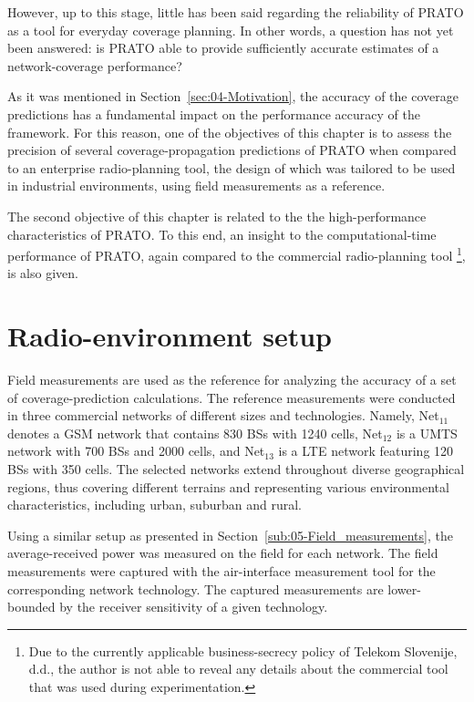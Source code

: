 However, up to this stage, little has been said regarding the reliability
of PRATO as a tool for everyday coverage planning. In other words,
a question has not yet been answered: is PRATO able to provide sufficiently
accurate estimates of a network-coverage performance?

As it was mentioned in Section~\ref{sec:04-Motivation}, the accuracy
of the coverage predictions has a fundamental impact on the performance
accuracy of the framework. For this reason, one of the objectives
of this chapter is to assess the precision of several coverage-propagation
predictions of PRATO when compared to an enterprise radio-planning
tool, the design of which was tailored to be used in industrial environments,
using field measurements as a reference.

The second objective of this chapter is related to the the high-performance
characteristics of PRATO. To this end, an insight to the computational-time
performance of PRATO, again compared to the commercial radio-planning
tool%
\footnote{Due to the currently applicable business-secrecy policy of Telekom
Slovenije, d.d., the author is not able to reveal any details about
the commercial tool that was used during experimentation.%
}, is also given.


\section{Radio-environment setup \label{sec:08-Radio_environment_setup}}

Field measurements are used as the reference for analyzing the accuracy
of a set of coverage-prediction calculations. The reference measurements
were conducted in three commercial networks of different sizes and
technologies. Namely, Net$_{11}$ denotes a GSM network that contains
830 BSs with 1240 cells, Net$_{12}$ is a UMTS network with 700 BSs
and 2000 cells, and Net$_{13}$ is a LTE network featuring 120 BSs
with 350 cells. The selected networks extend throughout diverse geographical
regions, thus covering different terrains and representing various
environmental characteristics, including urban, suburban and rural.

Using a similar setup as presented in Section~\ref{sub:05-Field_measurements},
the average-received power was measured on the field for each network.
The field measurements were captured with the air-interface measurement
tool for the corresponding network technology. The captured measurements
are lower-bounded by the receiver sensitivity of a given technology.

